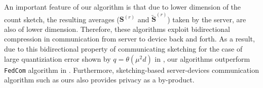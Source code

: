 \documentclass[review,onefignum,onetabnum]{siamart190516}
\begin{document}
\begin{remark}
An important feature of our algorithm is that due to lower dimension of the count sketch, the resulting averages ($\mathbf{S}^{(r)}$ and  $\tilde{\mathbf{S}}^{(r)}$) taken by the server, are also of lower dimension. 
Therefore, these algorithms exploit bidirectional compression in communication from server to device back and forth. 
As a result, due to this bidirectional property of communicating sketching for the case of large quantiziation error shown by $q=\theta(\mu^2 d)$ in \cite{haddadpour2020federated}, our algorithms outperform \texttt{FedCom} algorithm in \cite{haddadpour2020federated}. 
Furthermore, sketching-based server-devices communication algorithm such as ours also provides privacy as a by-product.
\end{remark}\vspace{-0.3cm}
\end{document}
